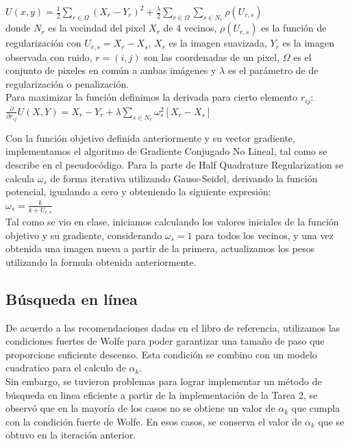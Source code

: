 \documentclass[10pt,journal,compsoc]{styles/IEEEtran}
\begin{document}
$U(x,y)=\frac{1}{2}\sum\limits_{r \in \Omega}(X_r-Y_r)^2+\frac{\lambda}{2} \sum\limits_{r \in \Omega} \sum\limits_{s \in N_r}\rho(U_{r,s})$\\

donde $N_r$ es la vecindad del pixel $X_r$ de 4 vecinos, $\rho(U_{r,s})$ es la función de regularizaci\'on con $U_{r,s}=X_r-X_s$, $X_r$ es la imagen suavizada, $Y_r$ es la imagen observada con ruido, $r=(i,j)$ son las coordenadas de un pixel, $\Omega$ es el conjunto de pixeles en común a ambas imágenes y $\lambda$ es el parámetro de de regularizaci\'on o penalización.\\

Para maximizar la función definimos la derivada para cierto elemento $r_{ij}$:\\
 
$\frac{\partial}{\partial r_{ij}} U(X,Y)=X_r-Y_r+\lambda \sum\limits_{s \in N_r} \omega_s^2 [X_r-X_s]$

Con la función objetivo definida anteriormente y su vector gradiente, implementamos el algoritmo de Gradiente Conjugado No Lineal, tal como se describe en el pseudoc\'odigo. Para la parte de Half Quadrature Regularization se calcula $\omega_s$ de forma iterativa utilizando Gauss-Seidel, derivando la funci\'on potencial, igualando a cero y obteniendo la siguiente expresi\'on:\\

$\omega_s=\frac{k}{k+U_{r,s}}$\\

Tal como se vio en clase, iniciamos calculando los valores iniciales de la función objetivo y su gradiente, considerando $\omega_s=1$ para todos los vecinos, y una vez obtenida una imagen nueva a partir de la primera, actualizamos los pesos utilizando la formula obtenida anteriormente.\\

\subsection{B\'usqueda en l\'inea}

De acuerdo a las recomendaciones dadas en el libro de referencia, utilizamos las condiciones fuertes de Wolfe para poder garantizar una tamaño de paso que proporcione suficiente descenso. Esta condición se combino con un modelo cuadratico para el calculo de $\alpha_k$.\\

Sin embargo, se tuvieron problemas para lograr implementar un método de búsqueda en linea eficiente a partir de la implementación de la Tarea 2, se observ\'o que en la mayoría de los casos no se obtiene un valor de $\alpha_k$ que cumpla con la condición fuerte de Wolfe. En esos casos, se conserva el valor de $\alpha_k$ que se obtuvo en la iteración anterior.\\
\end{document}
